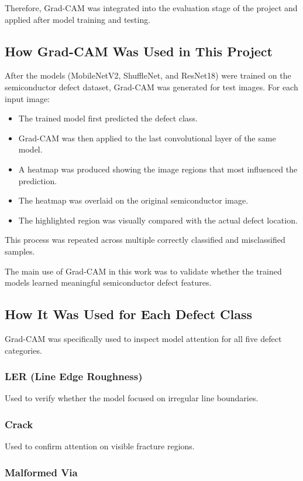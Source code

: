 Therefore, Grad-CAM was integrated into the evaluation stage of the project and applied after model training and testing.

\subsection{How Grad-CAM Was Used in This Project}
After the models (MobileNetV2, ShuffleNet, and ResNet18) were trained on the semiconductor defect dataset, Grad-CAM was generated for test images.
For each input image:
\begin{itemize}
\item The trained model first predicted the defect class.
\item Grad-CAM was then applied to the last convolutional layer of the same model.
\item A heatmap was produced showing the image regions that most influenced the prediction.
\item The heatmap was overlaid on the original semiconductor image.
\item The highlighted region was visually compared with the actual defect location.
\end{itemize}
This process was repeated across multiple correctly classified and misclassified samples.

The main use of Grad-CAM in this work was to validate whether the trained models learned meaningful semiconductor defect features.

\subsection{How It Was Used for Each Defect Class}
Grad-CAM was specifically used to inspect model attention for all five defect categories.

\subsubsection{ LER (Line Edge Roughness)}

Used to verify whether the model focused on irregular line boundaries.

\subsubsection{Crack}

Used to confirm attention on visible fracture regions.

\subsubsection{Malformed Via}

